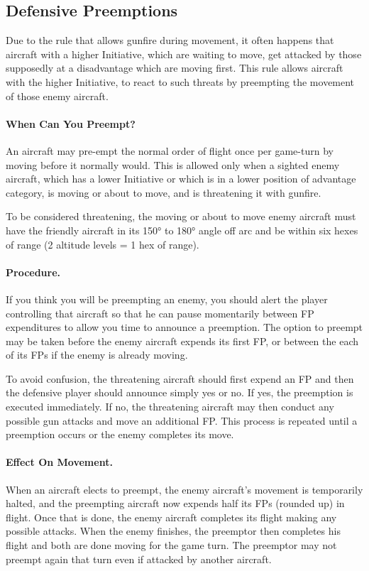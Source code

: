 \subsection{Defensive Preemptions}

Due to the rule that allows gunfire during movement, it often happens that aircraft with a higher Initiative, which are waiting to move, get attacked by those supposedly at a disadvantage which are moving first. This rule allows aircraft with the higher Initiative, to react to such threats by preempting the movement of those enemy aircraft.

\paragraph{When Can You Preempt?} An aircraft may pre-empt the normal order of flight once per game-turn by moving before it normally would. This is allowed only when a sighted enemy aircraft, which has a lower Initiative or which is in a lower position of advantage category, is moving or about to move, and is threatening it with gunfire.

To be considered threatening, the moving or about to move enemy aircraft must have the friendly aircraft in its 150° to 180° angle off arc and be within six hexes of range (2 altitude levels = 1 hex of range).

\paragraph{Procedure.} If you think you will be preempting an enemy, you should alert the player controlling that aircraft so that he can pause momentarily between FP expenditures to allow you time to announce a preemption. The option to preempt may be taken before the enemy aircraft expends its first FP, or between the each of its FPs if the enemy is already moving.

To avoid confusion, the threatening aircraft should first expend an FP and then the defensive player should announce simply yes or no. If yes, the preemption is executed immediately. If no, the threatening aircraft may then conduct any possible gun attacks and move an additional FP. This process is repeated until a preemption occurs or the enemy completes its move.

\paragraph{Effect On Movement.} When an aircraft elects to preempt, the enemy aircraft's movement is temporarily halted, and the preempting aircraft now expends half its FPs (rounded up) in flight. Once that is done, the enemy aircraft completes its flight making any possible attacks. When the enemy finishes, the preemptor then completes his flight and both are done moving for the game turn. The preemptor may not preempt again that turn even if attacked by another aircraft.

